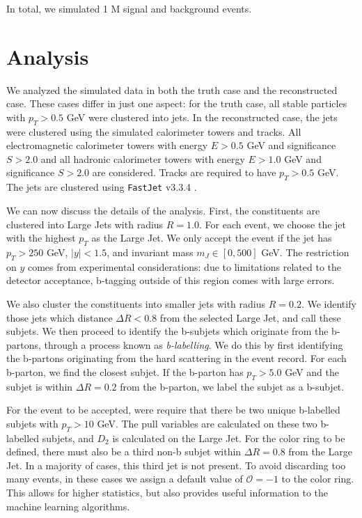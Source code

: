 \documentclass[10pt,a4paper]{book}
\def\code#1{\texttt{#1}}
\begin{document}
In total, we simulated 1 M signal and background events.


\section{Analysis}

We analyzed the simulated data in both the truth case and the reconstructed case. These cases differ in just one aspect: for the truth case, all stable particles with $p_T > 0.5$ GeV were clustered into jets. In the reconstructed case, the jets were clustered using the simulated calorimeter towers and tracks. All electromagnetic calorimeter towers with energy $E > 0.5$ GeV and significance $S > 2.0$ and all hadronic calorimeter towers with energy $E > 1.0$ GeV and significance $S > 2.0$ are considered. Tracks are required to have $p_T > 0.5$ GeV. The jets are clustered using \code{FastJet} v3.3.4 \cite{Cacciari:2011ma}.

We can now discuss the details of the analysis. First, the constituents are clustered into Large Jets with radius $R=1.0$.  For  each  event,  we  choose  the jet with the highest $p_T$ as the Large Jet. We only accept the event if the jet has $p_T > 250$ GeV, $\vert y \vert < 1.5$, and invariant mass $m_J \in [0,500]$ GeV. The restriction on $y$ comes from experimental considerations: due to limitations related to the detector acceptance, b-tagging outside of this region comes with large errors. 

We  also  cluster  the  constituents  into  smaller  jets with radius $R = 0.2$. We identify those jets which distance $\Delta R < 0.8$ from the selected Large Jet, and call these subjets. We then proceed to identify the b-subjets which originate from the b-partons, through a process known as \emph{b-labelling}. We do this by first identifying the b-partons originating from the hard scattering in the event record. For each b-parton, we find the closest subjet. If the b-parton has $p_T > 5.0$ GeV and the subjet is within $\Delta R = 0.2$ from the b-parton, we label the subjet as a b-subjet. 

For the event to be accepted, were require that there be two unique b-labelled subjets with $p_T > 10$ GeV. The pull variables are calculated on these two b-labelled subjets, and $D_2$ is calculated on the Large Jet. For the color ring to be defined, there must also be a third non-b subjet within $\Delta R = 0.8$ from the Large Jet. In a majority of cases, this third jet is not present. To avoid discarding too many events, in these cases we assign a default value of $\mathcal{O} = -1$ to the color ring. This allows for higher statistics, but also provides useful information to the machine learning algorithms.
\end{document}
